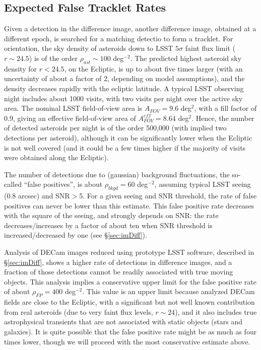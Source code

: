 \subsection{Expected False Tracklet Rates \label{sec:tracklets} }

Given a detection in the difference image,  another difference image, obtained at a different epoch, 
is searched for a matching detectio to form a tracklet. For orientation, the sky 
density of asteroids down to LSST $5\sigma$ faint flux limit ($r \sim 24.5$) is of the order 
$\rho_{ast} \sim 100$ deg$^{-2}$. The predicted highest asteroid sky density for $r<24.5$, 
on the Ecliptic, is up to about five times larger (with an uncertainty of about a factor of 2, 
depending on model assumptions), and the density decreases rapidly with the ecliptic latitude. 
A typical LSST observing night includes about 1000 visits, with two visits per night over 
the active sky area. The nominal LSST field-of-view area is $A_{FOV}=9.6$ deg$^2$, with a 
fill factor of 0.9, giving an effective field-of-view area of $A_{FOV}^{eff}=8.64$ deg$^2$. Hence, 
the number of detected asteroids per night is of the order 500,000 (with implied two detections 
per asteroid), although it can be significantly lower when the Ecliptic is not well covered (and 
it could be a few times higher if the majority of visits were obtained along the Ecliptic). 

The number of detections due to (gaussian) background fluctuations, the so-called ``false 
positives'', is about $\rho_{bkgd} = 60$ deg$^{-2}$, assuming typical LSST seeing (0.8 arcsec) 
and SNR$>$5. For a given seeing and SNR threshold, the rate of false positives can never be 
lower than this estimate. This false positive rate decreases with the square of the seeing, and 
strongly depends on SNR: the rate decreases/increases by a factor of about ten when SNR 
threshold is increased/decreased by one (see \S\ref{sec:imDiff}). 

Analysis of DECam images reduced using prototype LSST software, described in \S\ref{sec:imDiff},  
shows a higher rate of detections in difference images, and a fraction of those detections 
cannot be readily associated with true moving objects. This analysis implies a conservative 
upper limit for the false positive rate of about $\rho_{FP} =  400$ deg$^{-2}$. This value 
is an upper limit because analyzed DECam fields are close to the Ecliptic, with a significant but
not well known contribution from real asteroids (due to very faint flux levels, $r \sim 24$),
and it also includes true astrophysical transients that are not associated with static objects
(stars and galaxies). It is quite possible that the false positive rate might be as much as four 
times lower, though we will proceed with the most conservative estimate above. 

